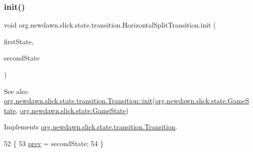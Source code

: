 \subsubsection{\texorpdfstring{init()}{init()}}
{\footnotesize\ttfamily void org.\+newdawn.\+slick.\+state.\+transition.\+Horizontal\+Split\+Transition.\+init (\begin{DoxyParamCaption}\item[{\mbox{\hyperlink{interfaceorg_1_1newdawn_1_1slick_1_1state_1_1_game_state}{Game\+State}}}]{first\+State,  }\item[{\mbox{\hyperlink{interfaceorg_1_1newdawn_1_1slick_1_1state_1_1_game_state}{Game\+State}}}]{second\+State }\end{DoxyParamCaption})\hspace{0.3cm}{\ttfamily [inline]}}

\begin{DoxySeeAlso}{See also}
\mbox{\hyperlink{interfaceorg_1_1newdawn_1_1slick_1_1state_1_1transition_1_1_transition_a7b59f0c9205f1f0417ee18bc526e5b01}{org.\+newdawn.\+slick.\+state.\+transition.\+Transition\+::init}}(\mbox{\hyperlink{interfaceorg_1_1newdawn_1_1slick_1_1state_1_1_game_state}{org.\+newdawn.\+slick.\+state.\+Game\+State}}, \mbox{\hyperlink{interfaceorg_1_1newdawn_1_1slick_1_1state_1_1_game_state}{org.\+newdawn.\+slick.\+state.\+Game\+State}}) 
\end{DoxySeeAlso}


Implements \mbox{\hyperlink{interfaceorg_1_1newdawn_1_1slick_1_1state_1_1transition_1_1_transition_a7b59f0c9205f1f0417ee18bc526e5b01}{org.\+newdawn.\+slick.\+state.\+transition.\+Transition}}.


\begin{DoxyCode}
52                                                                   \{
53         \mbox{\hyperlink{classorg_1_1newdawn_1_1slick_1_1state_1_1transition_1_1_horizontal_split_transition_a07a49cfa318899ffe21df13886c4f9f3}{prev}} = secondState;
54     \}
\end{DoxyCode}
\mbox{\label{classorg_1_1newdawn_1_1slick_1_1state_1_1transition_1_1_horizontal_split_transition_a4c6260f80153048b389e151023b8efcc}} 
